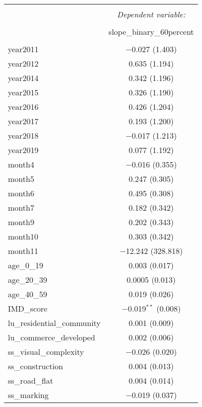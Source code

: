 \begin{table}[!htbp] \centering 
  \caption{} 
  \label{} 
\small 
\begin{tabular}{@{\extracolsep{1pt}}lc} 
\\[-1.8ex]\hline 
\hline \\[-1.8ex] 
 & \multicolumn{1}{c}{\textit{Dependent variable:}} \\ 
\cline{2-2} 
\\[-1.8ex] & slope\_binary\_60percent \\ 
\hline \\[-1.8ex] 
 year2011 & $-$0.027 (1.403) \\ 
  year2012 & 0.635 (1.194) \\ 
  year2014 & 0.342 (1.196) \\ 
  year2015 & 0.326 (1.190) \\ 
  year2016 & 0.426 (1.204) \\ 
  year2017 & 0.193 (1.200) \\ 
  year2018 & $-$0.017 (1.213) \\ 
  year2019 & 0.077 (1.192) \\ 
  month4 & $-$0.016 (0.355) \\ 
  month5 & 0.247 (0.305) \\ 
  month6 & 0.495 (0.308) \\ 
  month7 & 0.182 (0.342) \\ 
  month9 & 0.202 (0.343) \\ 
  month10 & 0.303 (0.342) \\ 
  month11 & $-$12.242 (328.818) \\ 
  age\_0\_19 & 0.003 (0.017) \\ 
  age\_20\_39 & 0.0005 (0.013) \\ 
  age\_40\_59 & 0.019 (0.026) \\ 
  IMD\_score & $-$0.019$^{**}$ (0.008) \\ 
  lu\_residential\_community & 0.001 (0.009) \\ 
  lu\_commerce\_developed & 0.002 (0.006) \\ 
  ss\_visual\_complexity & $-$0.026 (0.020) \\ 
  ss\_construction & 0.004 (0.013) \\ 
  ss\_road\_flat & 0.004 (0.014) \\ 
  ss\_marking & $-$0.019 (0.037) \\ 

\end{tabular}
\end{table}
